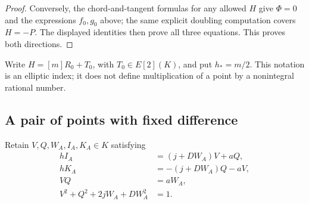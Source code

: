 \documentclass[11pt,a4paper]{article}
\begin{document}
\begin{proof}
Conversely, the chord-and-tangent formulas for any allowed $H$ give
$\Phi=0$ and the expressions $f_0,g_0$ above; the same explicit
doubling computation covers $H=-P$. The displayed identities then
prove all three equations. This proves both directions.
\end{proof}

Write $H=[m]R_0+T_0$, with $T_0\in E[2](K)$, and put $h_*=m/2$.
This notation is an elliptic index; it does not define multiplication
of a point by a nonintegral rational number.


\subsection{A pair of points with fixed difference}

Retain $V,Q,W_A,I_A,K_A\in K$ satisfying
\begin{equation}\label{eq:pairchart}
 \begin{split}
 hI_A&=(j+DW_A)V+aQ,\\
 hK_A&=-(j+DW_A)Q-aV,\\
 VQ&=aW_A,\\
 V^2+Q^2+2jW_A+DW_A^2&=1.
 \end{split}
\end{equation}
\end{document}
